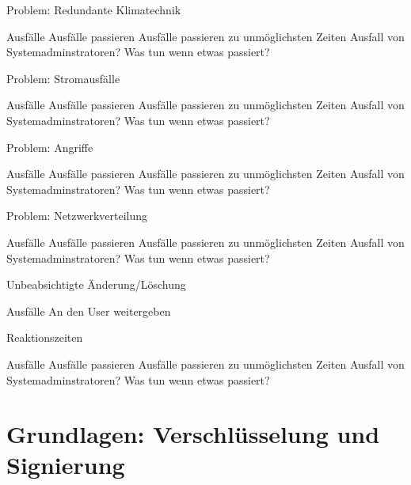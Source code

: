 \documentclass[10pt]{beamer}
\begin{document}
\begin{frame}[fragile]{Problem: Redundante Klimatechnik}
\begin{alertblock}{Ausfälle}
	Ausfälle passieren
	Ausfälle passieren zu unmöglichsten Zeiten
	Ausfall von Systemadminstratoren?
	Was tun wenn etwas passiert?
\end{alertblock}
\end{frame}

\begin{frame}[fragile]{Problem: Stromausfälle}
\begin{alertblock}{Ausfälle}
	Ausfälle passieren
	Ausfälle passieren zu unmöglichsten Zeiten
	Ausfall von Systemadminstratoren?
	Was tun wenn etwas passiert?
\end{alertblock}
\end{frame}

\begin{frame}[fragile]{Problem: Angriffe}
\begin{alertblock}{Ausfälle}
	Ausfälle passieren
	Ausfälle passieren zu unmöglichsten Zeiten
	Ausfall von Systemadminstratoren?
	Was tun wenn etwas passiert?
\end{alertblock}
\end{frame}

\begin{frame}[fragile]{Problem: Netzwerkverteilung}
\begin{alertblock}{Ausfälle}
	Ausfälle passieren
	Ausfälle passieren zu unmöglichsten Zeiten
	Ausfall von Systemadminstratoren?
	Was tun wenn etwas passiert?
\end{alertblock}
\end{frame}

\begin{frame}[fragile]{Unbeabsichtigte Änderung/Löschung}
\begin{alertblock}{Ausfälle}
	An den User weitergeben
	
\end{alertblock}
\end{frame}

\begin{frame}[fragile]{Reaktionszeiten}
\begin{alertblock}{Ausfälle}
	Ausfälle passieren
	Ausfälle passieren zu unmöglichsten Zeiten
	Ausfall von Systemadminstratoren?
	Was tun wenn etwas passiert?
\end{alertblock}
\end{frame}

\section{Grundlagen: Verschlüsselung und Signierung}
\end{document}
